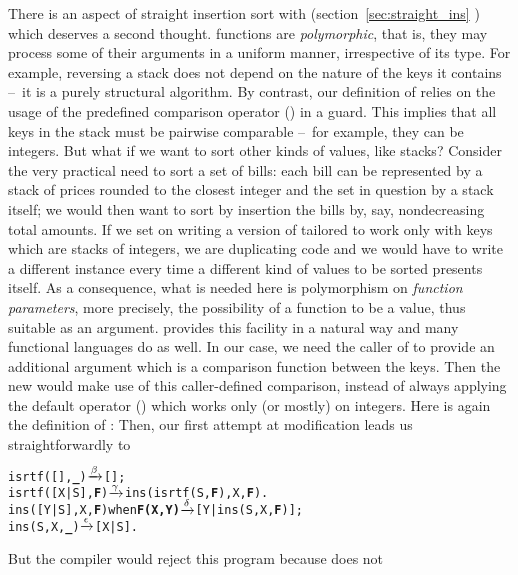 
There is an aspect of straight insertion sort with 
(section~\ref{sec:straight_ins} ) which
deserves a second thought. \Erlang functions are
\emph{polymorphic}, that is,
they may process some of their arguments in a uniform manner,
irrespective of its type. For example, reversing a stack does not
depend on the nature of the keys it contains --~it is a purely
structural algorithm. By contrast, our definition of 
relies on the usage of the predefined comparison operator
(\erlcode{>}) in a guard. This implies that all keys in the stack must
be pairwise comparable --~for example, they can be integers. But what
if we want to sort other kinds of values, like stacks? Consider the
very practical need to sort a set of bills: each bill can be
represented by a stack of prices rounded to the closest integer and
the set in question by a stack itself; we would then want to sort by
insertion the bills by, say, nondecreasing total amounts. If we set on
writing a version of  tailored to work only with keys
which are stacks of integers, we are duplicating code and we would
have to write a different instance every time a different kind of
values to be sorted presents itself. As a consequence, what is needed
here is polymorphism on \emph{function parameters}, more precisely,
the possibility of a function to be a value, thus suitable as an
argument. \Erlang provides this facility in a natural way and many
functional languages do as well. In our case, we need the caller of
 to provide an additional argument which is a
comparison function between the keys. Then the new 
would make use of this caller\hyp{}defined comparison, instead of
always applying the default operator (\erlcode{>}) which works only
(or mostly) on integers. Here is again the definition of
:  Then, our first attempt at
modification leads us straightforwardly to
\begin{alltt}
isrtf(   [],\textbf{\_})             \(\smashedrightarrow{\beta}\) [];
isrtf([X|S],\textbf{F})             \(\smashedrightarrow{\gamma}\) ins(isrtf(S,\textbf{F}),X,\textbf{F}).
ins([Y|S],X,\textbf{F}) when \textbf{F(X,Y)} \(\smashedrightarrow{\delta}\) [Y|ins(S,X,\textbf{F})];
ins(    S,X,\textbf{\_})             \(\smashedrightarrow{\epsilon}\) [X|S].
\end{alltt}
But the compiler would reject this program because \Erlang does not
